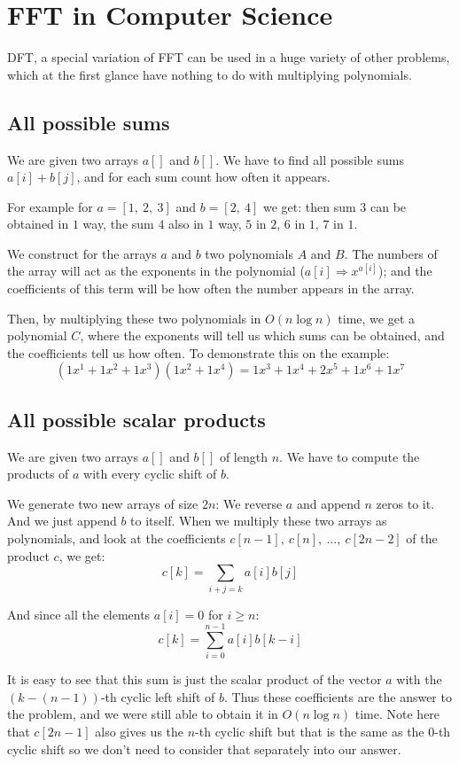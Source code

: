 \documentclass[28]{report}
\begin{document}
\section{FFT in Computer Science}
DFT, a special variation of FFT can be used in a huge variety of other problems, which at the first glance have nothing to do with multiplying polynomials.

\subsection{All possible sums}

We are given two arrays $a[]$ and $b[]$. We have to find all possible sums $a[i] + b[j]$, and for each sum count how often it appears.

For example for $a = [1,~ 2,~ 3]$ and $b = [2,~ 4]$ we get: then sum $3$ can be obtained in $1$ way, the sum $4$ also in $1$ way, $5$ in $2$, $6$ in $1$, $7$ in $1$.

We construct for the arrays $a$ and $b$ two polynomials $A$ and $B$. The numbers of the array will act as the exponents in the polynomial ($a[i] \Rightarrow x^{a[i]}$); and the coefficients of this term will be how often the number appears in the array.

Then, by multiplying these two polynomials in $O(n \log n)$ time, we get a polynomial $C$, where the exponents will tell us which sums can be obtained, and the coefficients tell us how often. To demonstrate this on the example:
$$(1 x^1 + 1 x^2 + 1 x^3) (1 x^2 + 1 x^4) = 1 x^3 + 1 x^4 + 2 x^5 + 1 x^6 + 1 x^7$$

\subsection{All possible scalar products}

We are given two arrays $a[]$ and $b[]$ of length $n$. We have to compute the products of $a$ with every cyclic shift of $b$.

We generate two new arrays of size $2n$: We reverse $a$ and append $n$ zeros to it. And we just append $b$ to itself. When we multiply these two arrays as polynomials, and look at the coefficients $c[n-1],~ c[n],~ \dots,~ c[2n-2]$ of the product $c$, we get:
$$c[k] = \sum_{i+j=k} a[i] b[j]$$

And since all the elements $a[i] = 0$ for $i \ge n$:
$$c[k] = \sum_{i=0}^{n-1} a[i] b[k-i]$$

It is easy to see that this sum is just the scalar product of the vector $a$ with the $(k - (n - 1))$-th cyclic left shift of $b$. Thus these coefficients are the answer to the problem, and we were still able to obtain it in $O(n \log n)$ time. Note here that $c[2n-1]$ also gives us the $n$-th cyclic shift but that is the same as the $0$-th cyclic shift so we don't need to consider that separately into our answer.
\end{document}
